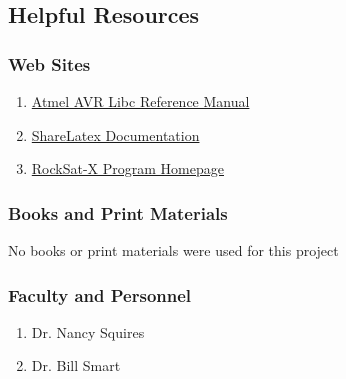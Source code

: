\subsection{Helpful Resources}
\subsubsection{Web Sites}
\begin{enumerate}
\item{\href{http://www.atmel.com/webdoc/avrlibcreferencemanual/}{Atmel AVR Libc Reference Manual}}
\item{\href{https://www.sharelatex.com/learn/}{ShareLatex Documentation}}
\item{\href{http://phobos.colorado.edu/national-programs/rs-x-2017-home}{RockSat-X Program Homepage}}
\end{enumerate}

\subsubsection{Books and Print Materials}
No books or print materials were used for this project

\subsubsection{Faculty and Personnel}
\begin{enumerate}
\item{Dr. Nancy Squires}
\item{Dr. Bill Smart}
\end{enumerate}
